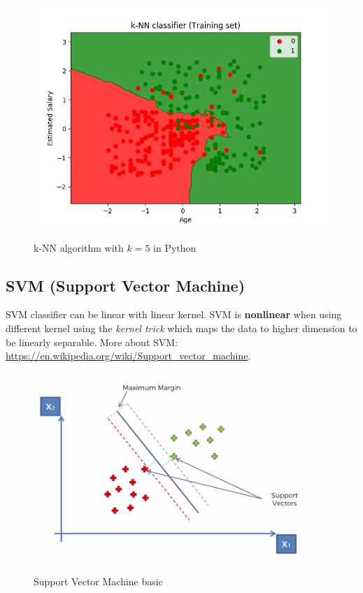 \documentclass[runningheads,a4paper]{llncs}
\begin{document}
\begin{figure}[H]
\centering
\begin{center}
\includegraphics[scale=0.8]{pics/KNN}
\label{uloha1:pic1}
\caption{k-NN algorithm with $k=5$ in Python} 
\end{center}
\end{figure}

\subsection{SVM (Support Vector Machine)}

SVM classifier can be linear with linear kernel. SVM is \textbf{nonlinear} when using different kernel using the \textit{kernel trick} which maps the data to higher dimension to be linearly separable. More about SVM: \url{https://en.wikipedia.org/wiki/Support_vector_machine}. 

\begin{figure}[H]
\centering
\begin{center}
\includegraphics[scale=0.5]{pics/svm_basic}
\label{uloha1:pic1}
\caption{Support Vector Machine basic} 
\end{center}
\end{figure}
\end{document}
